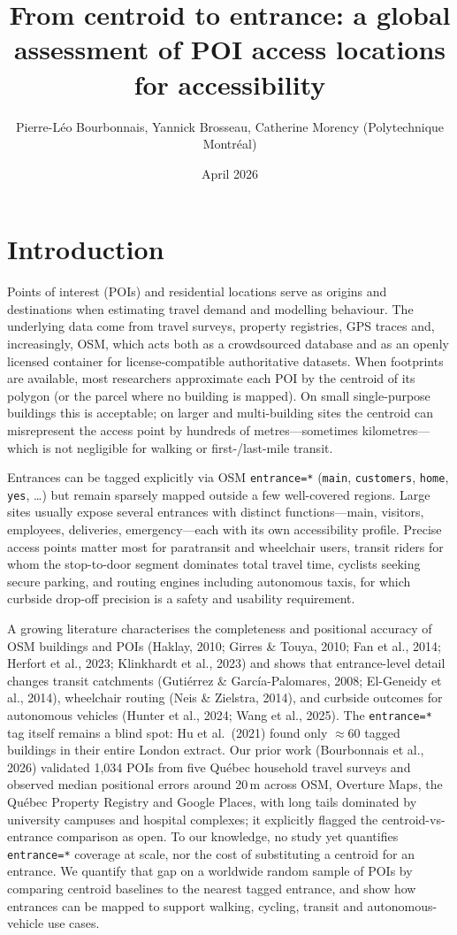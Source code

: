 \documentclass{article}
\title{From centroid to entrance: a global assessment of POI access locations for accessibility}
\author{Pierre-Léo Bourbonnais, Yannick Brosseau, Catherine Morency (Polytechnique Montréal)}
\date{April 2026}
\begin{document}
\maketitle

\section{Introduction}

Points of interest (POIs) and residential locations serve as origins and destinations
when estimating travel demand and modelling behaviour. The
underlying data come from travel surveys, property registries,
GPS traces and, increasingly, OSM, which acts both as a
crowdsourced database and as an openly licensed container for
license-compatible authoritative datasets. When footprints are
available, most researchers approximate each POI by the centroid
of its polygon (or the parcel where no building is mapped). On
small single-purpose buildings this is acceptable; on larger and
multi-building sites the centroid can misrepresent the access
point by hundreds of metres---sometimes kilometres---which is not
negligible for walking or first-/last-mile transit.

Entrances can be tagged explicitly via OSM \texttt{entrance=*}
(\texttt{main}, \texttt{customers}, \texttt{home}, \texttt{yes},
\ldots) but remain sparsely mapped outside a few well-covered
regions. Large sites usually expose several entrances with
distinct functions---main, visitors, employees, deliveries,
emergency---each with its own accessibility profile. Precise
access points matter most for paratransit and wheelchair users,
transit riders for whom the stop-to-door segment dominates total
travel time, cyclists seeking secure parking, and routing engines
including autonomous taxis, for which curbside drop-off precision
is a safety and usability requirement.

A growing literature characterises the completeness and
positional accuracy of OSM buildings and POIs (Haklay, 2010;
Girres \& Touya, 2010; Fan et al., 2014; Herfort et al., 2023;
Klinkhardt et al., 2023) and shows that entrance-level detail
changes transit catchments (Gutiérrez \& García-Palomares,
2008; El-Geneidy et al., 2014), wheelchair routing (Neis \&
Zielstra, 2014), and curbside outcomes for autonomous vehicles
(Hunter et al., 2024; Wang et al., 2025). The \texttt{entrance=*}
tag itself remains a blind spot: Hu et al.\ (2021) found only
\(\approx\)60 tagged buildings in their entire London extract.
Our prior work (Bourbonnais et al., 2026) validated 1{,}034 POIs
from five Québec household travel surveys and observed median
positional errors around 20\,m across OSM, Overture Maps, the
Québec Property Registry and Google Places, with long tails
dominated by university campuses and hospital complexes; it
explicitly flagged the centroid-vs-entrance comparison as open.
To our knowledge, no study yet quantifies \texttt{entrance=*}
coverage at scale, nor the cost of substituting a centroid for
an entrance. We quantify that gap on a worldwide random sample
of POIs by comparing centroid baselines to the nearest tagged
entrance, and show how entrances can be mapped to support
walking, cycling, transit and autonomous-vehicle use cases.
\end{document}
